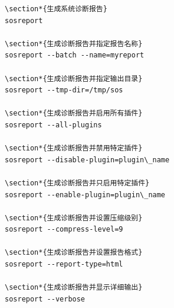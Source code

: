 \documentclass[12pt,UTF8]{ctexbook}
\begin{document}
\begin{verbatim}
\section*{生成系统诊断报告}
sosreport

\section*{生成诊断报告并指定报告名称}
sosreport --batch --name=myreport

\section*{生成诊断报告并指定输出目录}
sosreport --tmp-dir=/tmp/sos

\section*{生成诊断报告并启用所有插件}
sosreport --all-plugins

\section*{生成诊断报告并禁用特定插件}
sosreport --disable-plugin=plugin\_name

\section*{生成诊断报告并只启用特定插件}
sosreport --enable-plugin=plugin\_name

\section*{生成诊断报告并设置压缩级别}
sosreport --compress-level=9

\section*{生成诊断报告并设置报告格式}
sosreport --report-type=html

\section*{生成诊断报告并显示详细输出}
sosreport --verbose
\end{verbatim}
\end{document}
